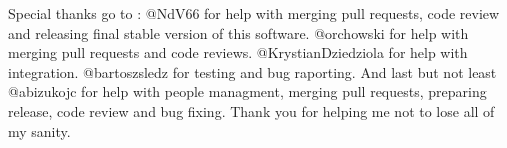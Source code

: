 \documentclass{article}
\begin{document}
Special thanks go to : \newline\newline
@NdV66 for help with merging pull requests, code review and releasing final stable version of this software.\newline
@orchowski for help with merging pull requests and code reviews.\newline
@KrystianDziedziola for help with integration.\newline
@bartoszsledz for testing and bug raporting.\newline
\newline
And last but not least\newline
@abizukojc for help with people managment, merging pull requests, preparing release, code review and bug fixing.\newline
\newline
Thank you for helping me not to lose all of my sanity.\newline
\end{document}

